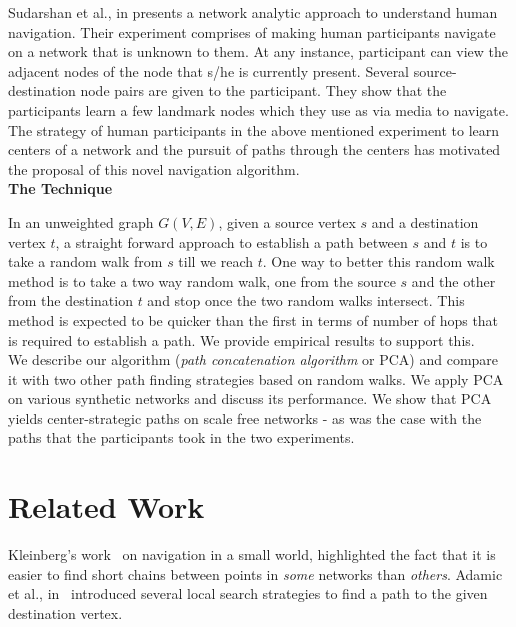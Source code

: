 \documentclass[10pt, conference, compsocconf]{IEEEtran}
\begin{document}
Sudarshan et al., in \cite{sudarshan11} presents a network analytic approach to understand human navigation. Their experiment comprises of making human participants navigate on a network that is unknown to them. 
At any instance, participant can view the adjacent nodes of the node that s/he is currently present. Several 
source-destination node pairs are given to the participant. 
They show that the participants learn a few landmark nodes which they use as via media to navigate. 
The strategy of human participants in the above mentioned experiment to learn centers of a network and the pursuit of paths through the centers has motivated the proposal of this novel navigation algorithm.\\

{\bf The Technique}

In an unweighted graph $G(V,E)$, given a source vertex $s$ and a destination vertex $t$, a straight forward approach to establish a path between $s$ and $t$ is to take a random walk from $s$ till we reach $t$. One way to better this random walk method is to take a two way random walk, one from the source $s$ and the other from the destination $t$ and stop once the two random walks intersect. This method is expected to be quicker than the first in terms of number of hops that is required to establish a path. We provide 
empirical results to support this.\\

We describe our algorithm (\emph{path concatenation algorithm} or PCA) and compare it with two other path finding strategies based on random walks. We apply PCA on various synthetic networks and discuss its performance. We show that PCA yields center-strategic paths on scale free networks - as was the  case with the paths that the participants took in the two experiments.\\

\section{Related Work}
\label{sec:4_related_work}

Kleinberg's work~\cite{kleinberg-2-00} on navigation in a small world, highlighted the fact that it is easier to find short chains between points in \emph{some} networks than \emph{others}. Adamic et al., in~\cite{adamic01} introduced several local search strategies to find a path to the given destination vertex.\\
\end{document}
